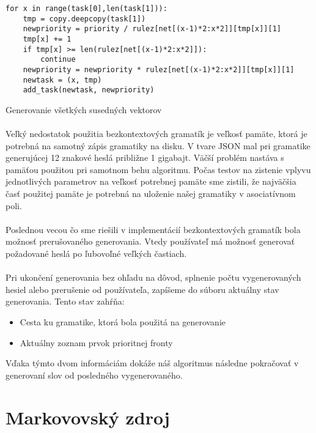 \begin{listing}
\begin{verbatim}
for x in range(task[0],len(task[1])):
	tmp = copy.deepcopy(task[1])
	newpriority = priority / rulez[net[(x-1)*2:x*2]][tmp[x]][1]
	tmp[x] += 1
	if tmp[x] >= len(rulez[net[(x-1)*2:x*2]]):
		continue
	newpriority = newpriority * rulez[net[(x-1)*2:x*2]][tmp[x]][1]
	newtask = (x, tmp)
	add_task(newtask, newpriority)
\end{verbatim}
\caption{Generovanie všetkých susedných vektorov}
\label{lst:generujSusedov}
\end{listing}

\paragraph{}
Veľký nedostatok použitia bezkontextových gramatík je veľkosť pamäte, ktorá je potrebná na samotný zápis gramatiky na disku. V tvare JSON mal pri gramatike generujúcej 12 znakové heslá približne 1 gigabajt. Väčší problém nastáva s pamäťou použitou pri samotnom behu algoritmu. Počas testov na zistenie vplyvu jednotlivých parametrov na veľkosť potrebnej pamäte sme zistili, že najväčšia časť použitej pamäte je potrebná na uloženie našej gramatiky v asociatívnom poli.

\paragraph{}
Poslednou vecou čo sme riešili v implementácií bezkontextových gramatík bola možnosť prerušovaného generovania. Vtedy používateľ má možnosť generovať požadované heslá po ľubovoľné veľkých častiach.

\paragraph{}
Pri ukončení generovania bez ohľadu na dôvod, splnenie počtu vygenerovaných hesiel alebo prerušenie od používateľa, zapíšeme do súboru aktuálny stav generovania. Tento stav zahŕňa:
\begin{itemize}
	\item Cesta ku gramatike, ktorá bola použitá na generovanie
	\item Aktuálny zoznam prvok prioritnej fronty
\end{itemize}
Vďaka týmto dvom informáciám dokáže náš algoritmus následne pokračovať v generovaní slov od posledného vygenerovaného.

\section{Markovovský zdroj}
